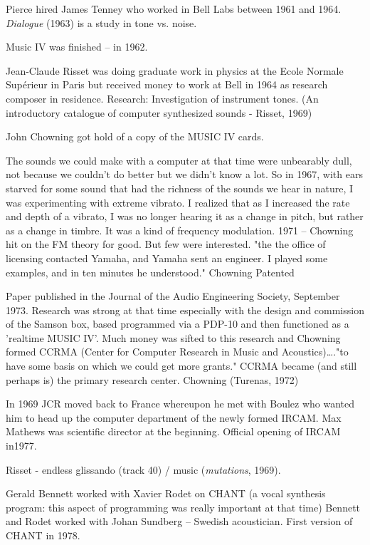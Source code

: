 Pierce hired James Tenney who worked in Bell Labs between 1961 and 1964. \textit{Dialogue} (1963) is a study in tone vs. noise.

Music IV was finished – in 1962.

Jean-Claude Risset was doing graduate work in physics at the Ecole Normale Sup\'erieur in Paris but received money to work at Bell in 1964 as research composer in residence. Research: Investigation of instrument tones. (An introductory catalogue of computer synthesized sounds - Risset, 1969)

John Chowning got hold of a copy of the MUSIC IV cards.

The sounds we could make with a computer at that time were unbearably dull, not because we couldn't do better but we didn't know a lot. So in 1967, with ears starved for some sound that had the richness of the sounds we hear in nature, I was experimenting with extreme vibrato. I realized that as I increased the rate and depth of a vibrato, I was no longer hearing it as a change in pitch, but rather as a change in timbre. It was a kind of frequency modulation.
1971 – Chowning hit on the FM theory for good. But few were interested. "the the office of licensing contacted Yamaha, and Yamaha sent an engineer. I played some examples, and in ten minutes he understood." Chowning Patented

Paper published in the Journal of the Audio Engineering Society, September 1973. Research was strong at that time especially with the design and commission of the Samson box, based programmed via a PDP-10 and then functioned as a 'realtime MUSIC IV'. Much money was sifted to this research and Chowning formed CCRMA (Center for Computer Research in Music and Acoustics)…."to have some basis on which we could get more grants." CCRMA became (and still perhaps is) the primary research center. Chowning (Turenas, 1972)

In 1969 JCR moved back to France whereupon he met with Boulez who wanted him to head up the computer department of the newly formed IRCAM. Max Mathews was scientific director at the beginning. Official opening of IRCAM in1977.

Risset - endless glissando (track 40) / music (\textit{mutations}, 1969).

Gerald Bennett worked with Xavier Rodet on CHANT (a vocal synthesis program: this aspect of programming was really important at that time) Bennett and Rodet worked with Johan Sundberg – Swedish acoustician.  First version of CHANT in 1978.


